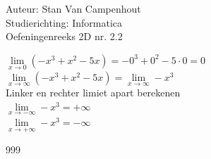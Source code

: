 \documentclass[a4paper]{article}
\begin{document}
  
\noindent \large Auteur: Stan Van Campenhout \\
\noindent \large Studierichting:  Informatica\\
\noindent \large Oefeningenreeks 2D nr. 2.2\\

\medskip

\normalsize

$ \lim\limits_{x \rightarrow 0} \left(-x^3 + x^2 - 5x \right) = -0^3 + 0^2 - 5 \cdot 0 = 0 $\\

$ \lim\limits_{x \rightarrow \infty} \left(-x^3 + x^2 - 5x \right) = \lim\limits_{x \rightarrow \infty} -x^3 $\\

Linker en rechter limiet apart berekenen \\

$ \lim\limits_{x \rightarrow  -\infty} -x^3 = +\infty $\\

$ \lim\limits_{x \rightarrow  +\infty} -x^3 = -\infty $\\

\begin{thebibliography}{999}
\end{thebibliography}
\end{document}
